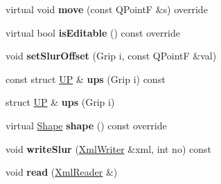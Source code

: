\begin{DoxyCompactItemize}
virtual void {\bfseries move} (const Q\+PointF \&s) override
\item 
\mbox{\label{class_ms_1_1_slur_tie_segment_a3beb1336d47956a0bd263a20a85d4d9d}} 
virtual bool {\bfseries is\+Editable} () const override
\item 
\mbox{\label{class_ms_1_1_slur_tie_segment_a41449c7a71eb7fc42d4384b3e560fd72}} 
void {\bfseries set\+Slur\+Offset} (Grip i, const Q\+PointF \&val)
\item 
\mbox{\label{class_ms_1_1_slur_tie_segment_a39cfeabe9663114fdbd2c3a37b88c62e}} 
const struct \hyperlink{struct_ms_1_1_u_p}{UP} \& {\bfseries ups} (Grip i) const
\item 
\mbox{\label{class_ms_1_1_slur_tie_segment_aca97082c86718bf65b5fc362e10122b2}} 
struct \hyperlink{struct_ms_1_1_u_p}{UP} \& {\bfseries ups} (Grip i)
\item 
\mbox{\label{class_ms_1_1_slur_tie_segment_afabd534baeefa0cfef3c7ff829fd8ad0}} 
virtual \hyperlink{class_ms_1_1_shape}{Shape} {\bfseries shape} () const override
\item 
\mbox{\label{class_ms_1_1_slur_tie_segment_a20f7817973d199a86229873ba935a0de}} 
void {\bfseries write\+Slur} (\hyperlink{class_ms_1_1_xml_writer}{Xml\+Writer} \&xml, int no) const
\item 
\mbox{\label{class_ms_1_1_slur_tie_segment_a4644eabd662d41c316f6ce15b8411862}} 
void {\bfseries read} (\hyperlink{class_ms_1_1_xml_reader}{Xml\+Reader} \&)
\end{DoxyCompactItemize}
